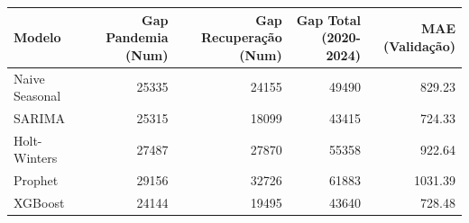 \begin{tabular}{lrrrr}
\toprule
Modelo & Gap Pandemia (Num) & Gap Recuperação (Num) & Gap Total (2020-2024) & MAE (Validação) \\
\midrule
Naive Seasonal & 25335 & 24155 & 49490 & 829.23 \\
SARIMA & 25315 & 18099 & 43415 & 724.33 \\
Holt-Winters & 27487 & 27870 & 55358 & 922.64 \\
Prophet & 29156 & 32726 & 61883 & 1031.39 \\
XGBoost & 24144 & 19495 & 43640 & 728.48 \\
\bottomrule
\end{tabular}
